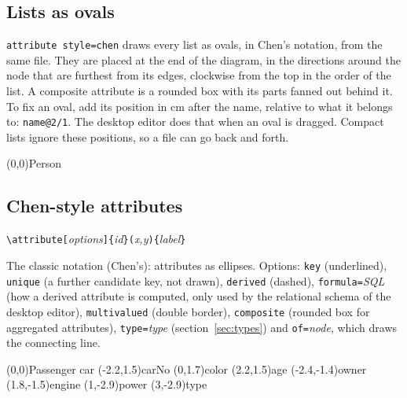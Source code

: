 \documentclass[10pt,a4paper]{article}
\newcommand\meta[1]{\textlangle\textit{#1}\textrangle}
\begin{document}
\subsection{Lists as ovals}
\label{sec:chenlists}

\texttt{attribute style=chen} draws every list as ovals, in Chen's notation, from the
same file. They are placed at the end of the diagram, in the directions around the node
that are furthest from its edges, clockwise from the top in the order of the list.
A composite attribute is a rounded box with its parts fanned out behind it. To fix an oval,
add its position in cm after the name, relative to what it belongs to:
\verb|name@2/1|. The desktop editor does that when an oval is dragged. Compact lists
ignore these positions, so a file can go back and forth.

\begin{example}
\begin{erdiagram}[attribute style=chen]
  (0,0){Person}
\end{erdiagram}
\end{example}

\subsection{Chen-style attributes}

\begin{center}
\verb|\attribute[|\meta{options}\verb|]{|\meta{id}\verb|}(|\meta{x,y}\verb|){|\meta{label}\verb|}|
\end{center}

The classic notation (Chen's): attributes as
ellipses. Options: \texttt{key} (underlined), \texttt{unique} (a further
candidate key, not drawn), \texttt{derived} (dashed), \texttt{formula=}\meta{SQL} (how a
derived attribute is computed, only used by the relational schema of the desktop
editor), \texttt{multivalued} (double border), \texttt{composite} (rounded box for
aggregated attributes), \texttt{type=}\meta{type} (section~\ref{sec:types}) and
\texttt{of=}\meta{node}, which draws the connecting line.

\begin{example}
\begin{erdiagram}
  (0,0){Passenger car}
  (-2.2,1.5){carNo}
  (0,1.7){color}
  (2.2,1.5){age}
    (-2.4,-1.4){owner}
    (1.8,-1.5){engine}
  (1,-2.9){power}
  (3,-2.9){type}
\end{erdiagram}
\end{example}
\end{document}
